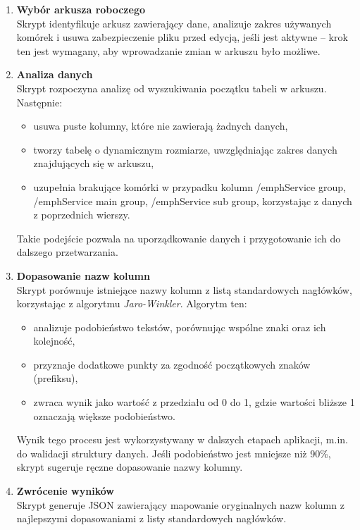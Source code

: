 \begin{enumerate}
    \item \textbf{Wybór arkusza roboczego} \\
          Skrypt identyfikuje arkusz zawierający dane, analizuje zakres używanych komórek i usuwa zabezpieczenie pliku przed edycją, jeśli jest aktywne -- krok ten jest wymagany, aby wprowadzanie zmian w arkuszu było możliwe.

    \item \textbf{Analiza danych} \\
          Skrypt rozpoczyna analizę od wyszukiwania początku tabeli w arkuszu. Następnie:
          \begin{itemize}
              \item usuwa puste kolumny, które nie zawierają żadnych danych,
              \item tworzy tabelę o dynamicznym rozmiarze, uwzględniając zakres danych znajdujących się w arkuszu,
              \item uzupełnia brakujące komórki w przypadku kolumn /emph{Service group}, /emph{Service main group}, /emph{Service sub group}, korzystając z danych z poprzednich wierszy.
          \end{itemize}
          Takie podejście pozwala na uporządkowanie danych i przygotowanie ich do dalszego przetwarzania.

    \item \textbf{Dopasowanie nazw kolumn} \\
          Skrypt porównuje istniejące nazwy kolumn z listą standardowych nagłówków, korzystając z algorytmu \emph{Jaro-Winkler}. Algorytm ten:
          \begin{itemize}
              \item analizuje podobieństwo tekstów, porównując wspólne znaki oraz ich kolejność,
              \item przyznaje dodatkowe punkty za zgodność początkowych znaków (prefiksu),
              \item zwraca wynik jako wartość z przedziału od 0 do 1, gdzie wartości bliższe 1 oznaczają większe podobieństwo.
          \end{itemize}
          Wynik tego procesu jest wykorzystywany w dalszych etapach aplikacji, m.in. do walidacji struktury danych. Jeśli podobieństwo jest mniejsze niż 90\%, skrypt sugeruje ręczne dopasowanie nazwy kolumny.

    \item \textbf{Zwrócenie wyników} \\
          Skrypt generuje JSON zawierający mapowanie oryginalnych nazw kolumn z najlepszymi dopasowaniami z listy standardowych nagłówków.
\end{enumerate}


